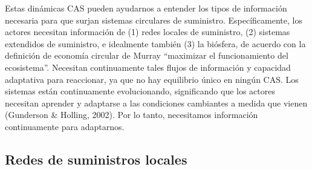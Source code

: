 \documentclass[runningheads]{llncs}
\begin{document}
Estas dinámicas CAS pueden ayudarnos a entender los tipos de información
necesaria para que surjan sistemas circulares de suministro.
Específicamente, los actores necesitan información de (1) redes locales
de suministro, (2) sistemas extendidos de suministro, e idealmente
también (3) la biósfera, de acuerdo con la definición de economía
circular de Murray ``maximizar el funcionamiento del ecosistema''.
Necesitan continuamente tales flujos de información y capacidad
adaptativa para reaccionar, ya que no hay equilibrio único en ningún
CAS. Los sistemas están continuamente evolucionando, significando que
los actores necesitan aprender y adaptarse a las condiciones cambiantes
a medida que vienen (Gunderson \& Holling, 2002). Por lo tanto,
necesitamos información continuamente para adaptarnos.

\hypertarget{redes-de-suministros-locales}{%
\subsection{Redes de suministros
locales}\label{redes-de-suministros-locales}}
\end{document}
